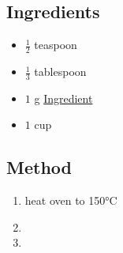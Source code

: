 \documentclass[11pt,a4paper]{article}
\begin{document}
\subsection*{Ingredients}

\begin{multicols}{2}

\begin{itemize}
   \item $ \frac{1}{2} $ teaspoon
   \item $ \frac{1}{3} $ tablespoon
   \item $ 1 $ \si{\gram} \href{https://en.wikipedia.org/wiki/Ingredient}{Ingredient}
\end{itemize}

\columnbreak

\begin{itemize}
   \item $ 1 $ cup
\end{itemize}

\end{multicols}

\medskip

\subsection*{Method}

\begin{enumerate}
   \item heat oven to 150\si{\celsius}
   \item \lipsum[2]
   \item \lipsum[3]
\end{enumerate}
\end{document}
